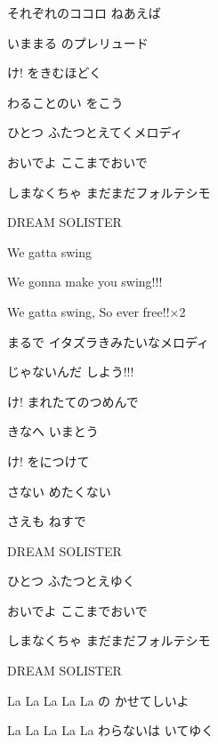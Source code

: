 \documentclass[14pt]{extreport}
\begin{document}
{  それぞれのココロ ねあえば
  \jisho{}

  いままる のプレリュード
  \jisho{}

\item
  け! をきむほどく
  \jisho{}

  わることのい をこう
  \jisho{}

  ひとつ ふたつとえてくメロディ
  \jisho{}

  おいでよ ここまでおいで
  \jisho{}

  しまなくちゃ まだまだフォルテシモ
  \jisho{}

  DREAM SOLISTER
  \jisho{}

\item
  We gatta swing
  \jisho{}

  We gonna make you swing!!!
  \jisho{}

  We gatta swing, So ever free!!×2
  \jisho{}

\item
  まるで イタズラきみたいなメロディ
  \jisho{}

  じゃないんだ しよう!!!
  \jisho{}

\item
  け! まれたてのつめんで
  \jisho{}

  きなへ いまとう
  \jisho{}

  け! をにつけて
  \jisho{}

  さない めたくない
  \jisho{}

  さえも ねすで
  \jisho{}

  DREAM SOLISTER
  \jisho{}

  ひとつ ふたつとえゆく
  \jisho{}

  おいでよ ここまでおいで
  \jisho{}

  しまなくちゃ まだまだフォルテシモ
  \jisho{}

  DREAM SOLISTER
  \jisho{}

\item
  La La La La La の かせてしいよ
  \jisho{}

  La La La La La わらないは いてゆく
  \jisho{}


}
\end{document}
